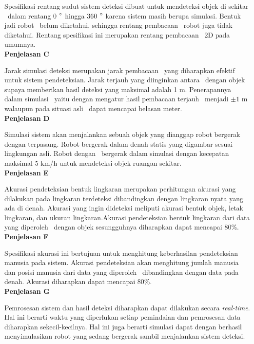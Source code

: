     Spesifikasi rentang sudut sistem deteksi dibuat untuk mendeteksi objek di sekitar \lidar\ dalam rentang 0 $\degree$ hingga 360 $\degree$ karena sistem masih berupa simulasi. Bentuk jadi robot \covid\ belum diketahui, sehingga rentang pembacaan \lidar\ robot juga tidak diketahui. Rentang spesifikasi ini merupakan rentang pembacaan \lidar\ 2D pada umumnya.\\
    \textbf{Penjelasan C}

    Jarak simulasi deteksi merupakan jarak pembacaan \lidar\ yang diharapkan efektif untuk sistem pendeteksian. Jarak terjauh yang diinginkan antara \lidar\ dengan objek supaya memberikan hasil deteksi yang maksimal adalah 1 m. Penerapannya dalam simulasi \lidar\ yaitu dengan mengatur hasil pembacaan terjauh \lidar\ menjadi $\pm 1$ m walaupun pada situasi asli \lidar\ dapat mencapai belasan meter.\\
    \textbf{Penjelasan D}

    Simulasi sistem akan menjalankan sebuah objek yang dianggap robot bergerak dengan \lidar terpasang. Robot bergerak dalam denah statis yang digambar sesuai lingkungan asli. Robot dengan \lidar\ bergerak dalam simulasi dengan kecepatan maksimal 5 km/h untuk mendeteksi objek ruangan sekitar.\\
    \textbf{Penjelasan E}

    Akurasi pendeteksian bentuk lingkaran merupakan perhitungan akurasi yang dilakukan pada lingkaran terdeteksi dibandingkan dengan lingkaran nyata yang ada di denah. Akurasi yang ingin dideteksi meliputi akurasi bentuk objek, letak lingkaran, dan ukuran lingkaran.Akurasi pendeteksian bentuk lingkaran dari data yang diperoleh \lidar\ dengan objek sesungguhnya diharapkan dapat mencapai 80\%.\\
    \textbf{Penjelasan F}

    Spesifikasi akurasi ini bertujuan untuk menghitung keberhasilan pendeteksian manusia pada sistem. Akurasi pendeteksian akan menghitung jumlah manusia dan posisi manusia dari data yang diperoleh \lidar\ dibandingkan dengan data pada denah. Akurasi diharapkan dapat mencapai 80\%.\\
    \textbf{Penjelasan G}
    
    Pemrosesan sistem dan hasil deteksi diharapkan dapat dilakukan secara \textit{real-time}. Hal ini berarti waktu yang diperlukan setiap pemindaian dan pemrosesan data diharapkan sekecil-kecilnya. Hal ini juga berarti simulasi dapat dengan berhasil menyimulasikan robot yang sedang bergerak sambil menjalankan sistem deteksi.

